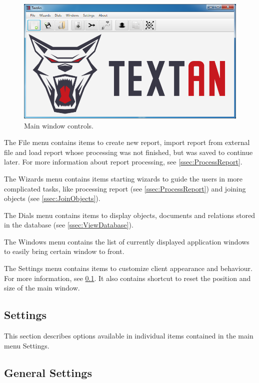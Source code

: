 \begin{figure}[!htb]
        \centering
        \includegraphics[width=\textwidth]{Images/main}
        \caption{Main window controls.}
        \label{fig:MainWindow}
\end{figure}

The File menu contains items to create new report, import report from external
file and load report whose processing was not finished, but was saved to continue
later. For more information about report processing, see \ref{ssec:ProcessReport}.

The Wizards menu contains items starting wizards to guide the users in more
complicated tasks, like processing report (see \ref{ssec:ProcessReport}) and
joining objects (see \ref{ssec:JoinObjects}).

The Dials menu contains items to display objects, documents and relations
stored in the database (see \ref{ssec:ViewDatabase}).

The Windows menu contains the list of currently displayed application windows
to easily bring certain window to front.

The Settings menu contains items to customize \textan{} client appearance and
behaviour. For more information, see \ref{ssec:Settings}. It also contains
shortcut to reset the position and size of the main window.

\subsection{Settings}
\label{ssec:Settings}

This section describes options available in individual items contained in the
main menu Settings.

\subsection{General Settings}
\label{sssec:GeneralSettings}

